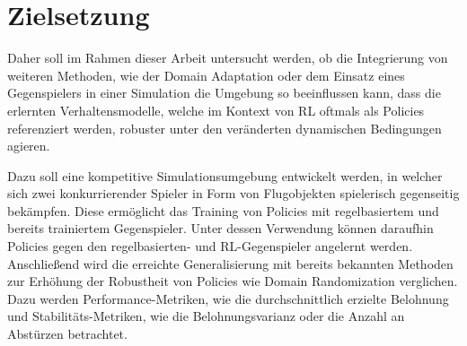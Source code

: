 \section{Zielsetzung}

Daher soll im Rahmen dieser Arbeit untersucht werden, ob die Integrierung von weiteren Methoden, wie der Domain Adaptation oder dem Einsatz eines Gegenspielers in einer Simulation die Umgebung so beeinflussen kann, dass die erlernten Verhaltensmodelle, welche im Kontext von RL oftmals als Policies referenziert werden, robuster unter den veränderten dynamischen Bedingungen agieren. 

Dazu soll eine kompetitive Simulationsumgebung entwickelt werden, in welcher sich zwei konkurrierender Spieler in Form von Flugobjekten spielerisch gegenseitig bekämpfen.
Diese ermöglicht das Training von Policies mit regelbasiertem und bereits trainiertem Gegenspieler.
Unter dessen Verwendung können daraufhin Policies gegen den regelbasierten- und RL-Gegenspieler angelernt werden. 
Anschließend wird die erreichte Generalisierung mit bereits bekannten Methoden zur Erhöhung der Robustheit von Policies wie Domain Randomization verglichen.
Dazu werden Performance-Metriken, wie die durchschnittlich erzielte Belohnung und Stabilitäts-Metriken, wie die Belohnungsvarianz oder die Anzahl an Abstürzen betrachtet. 


